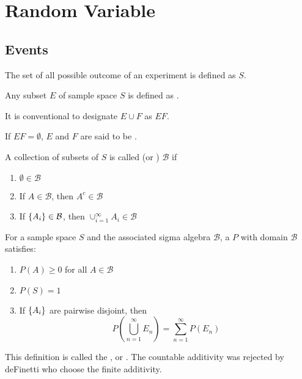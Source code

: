 \chapter{Random Variable}

\section{Events}

\begin{definition}
    The set of all possible outcome of an experiment is defined as  $S$.
\end{definition}

\begin{definition}[event]
    Any subset $E$ of sample space $S$ is defined as .
\end{definition}

It is conventional to designate $E \cup F$ as $EF$.


\begin{definition}
    If $EF = \emptyset $, $E$ and $F$ are said to be .
\end{definition}


\begin{definition}
    A collection of subsets of $S$ is called  (or ) $\mathcal{B}$ if
    \begin{enumerate}
        \item $\emptyset \in \mathcal{B}$
        \item If $A \in \mathcal{B}$, then $A^c \in \mathcal{B}$
        \item If $\set{A_i} \in \mathcal{B}$, then $\cup_{i=1}^\infty A_i \in \mathcal{B}$
    \end{enumerate}
\end{definition}


\begin{definition}
    For a sample space $S$ and the associated sigma algebra $\mathcal{B}$, a  $P$ with domain $\mathcal{B}$ satisfies:
    \begin{enumerate}
        \item $P(A) \geq 0$ for all $A \in \mathcal{B}$
        \item $P(S) = 1$
        \item If $\set{A_i}$ are pairwise disjoint, then        
            \begin{equation}
                P \left(\bigcup_{n=1}^\infty E_n \right) = \sum_{n=1}^\infty P(E_n)
            \end{equation}
    \end{enumerate}
    
    This definition is called the , or . The countable additivity was rejected by deFinetti who choose the finite additivity.
\end{definition}


